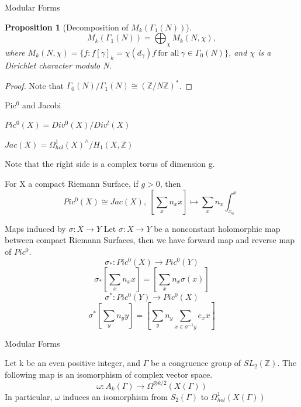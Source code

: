 \documentclass{beamer}
\theoremstyle{plain}
\newtheorem{proposition}{Proposition}[section]
\theoremstyle{definition}
\theoremstyle{remark}
\newcommand{\Z}{\mathbb{Z}}
\begin{document}
\begin{frame}{Modular Forms}
    \begin{proposition}[Decomposition of $M_k(\Gamma_1(N))$]
        \[M_k(\Gamma_1(N))=\bigoplus _{\chi } M_k(N,\chi),\] where $M_k(N,\chi)=\{f: f[\gamma]_k=\chi(d_{\gamma})f \  \text{for all} \ \gamma \in \Gamma_0(N) \}$,
        and $\chi$ is a Dirichlet character modulo N.
    \end{proposition}
    \begin{proof}
        Note that $\Gamma_0(N)/\Gamma_1(N) \cong (\Z/N\Z)^*$.
    \end{proof}
\end{frame}


\begin{frame}{Pic$^0$ and Jacobi}
    \begin{definition}
        $Pic^0(X)=Div^0(X)/Div^l(X)$
    \end{definition}\pause
    \begin{definition}
        $Jac(X)=\Omega^1_{hol}(X)^{\wedge} /H_1(X,\Z)$
    \end{definition}
    Note that the right side is a complex torus of dimension g. \pause
    \begin{theorem}
        For X a compact Riemann Surface, if $g > 0$, then
        \[ Pic^0(X) \cong Jac(X),\  [\sum_x n_x x]  \mapsto \sum_x n_x\int_{x_0}^x \]
    \end{theorem}
\end{frame}

\begin{frame}{Maps induced by $\sigma: X \to Y$}
    Let $\sigma: X \to Y$ be a nonconstant holomorphic map between compact Riemann Surfaces, then we have
    forward map and reverse map of $Pic^0$.
    \[\sigma_*: Pic^0(X) \to Pic^0(Y)\]
    \[\sigma_*[\sum_x n_x x] = [\sum_x n_x \sigma(x)]\]
    \vskip 0.2cm
    \[\sigma^*: Pic^0(Y) \to Pic^0(X)\]
    \[\sigma^*[\sum_y n_y y] = [\sum_y n_y \sum_{x\in \sigma^{-1}y} e_x x] \]
\end{frame}

\begin{frame}{Modular Forms}
    \begin{theorem}
        Let k be an even positive integer, and $\Gamma$ be a congruence group of $SL_2(\Z)$.
        The following map is an isomorphism of complex vector space.
        \[ \omega: A_k(\Gamma) \to \Omega^{\otimes k/2}(X(\Gamma))\]
        In particular, $\omega$ induces an isomorphism from $S_2(\Gamma)$ to $\Omega_{hol}^1(X(\Gamma))$
    \end{theorem}
\end{frame}
\end{document}
